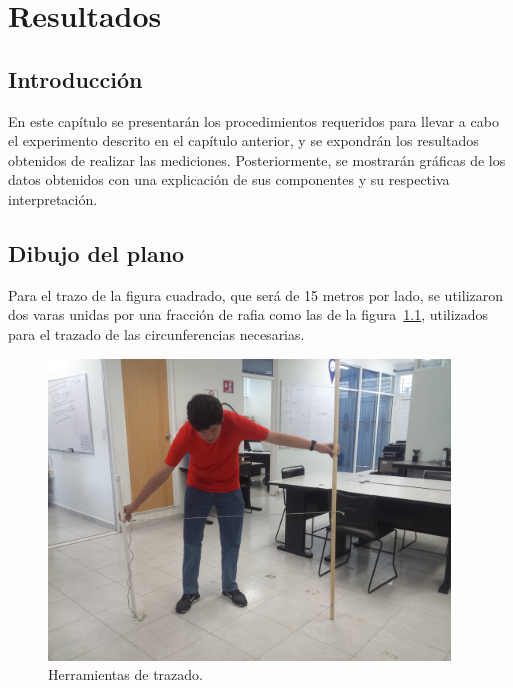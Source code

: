 
\chapter{Resultados} %

\label{Chap:Res} %

\section{Introducción}

En este capítulo se presentarán los procedimientos requeridos para llevar a cabo el experimento descrito en el capítulo anterior, y se expondrán los resultados obtenidos de realizar las mediciones. Posteriormente, se mostrarán gráficas de los datos obtenidos con una explicación de sus componentes y su respectiva interpretación. \\

\section{Dibujo del plano}

Para el trazo de la figura cuadrado, que será de 15 metros por lado, se utilizaron dos varas unidas por una fracción de rafia como las de la figura~\ref{fig:HerTraz}, utilizados para el trazado de las circunferencias necesarias.\\

\begin{figure}[H]
\centering
\includegraphics[width=0.95\textwidth]{Figures/Herr}
\caption[Herramientas de trazado.]{Herramientas de trazado.}
\label{fig:HerTraz}
\end{figure}

